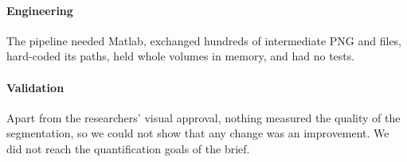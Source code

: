 \paragraph{Engineering} The pipeline needed Matlab, exchanged hundreds of intermediate PNG and
 files, hard-coded its paths, held whole volumes in memory, and had no tests.

\paragraph{Validation} Apart from the researchers' visual approval, nothing measured the quality of the
segmentation, so we could not show that any change was an improvement. We did not reach the
quantification goals of the brief.
